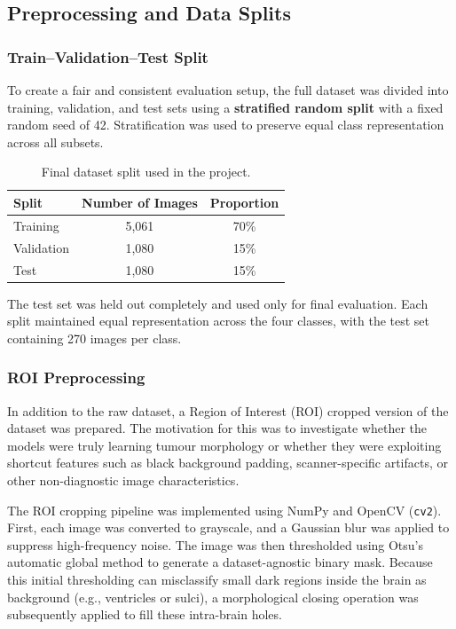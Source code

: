 \documentclass{article}
\begin{document}
\subsection{Preprocessing and Data Splits}

\subsubsection{Train--Validation--Test Split}

To create a fair and consistent evaluation setup, the full dataset was divided into training, validation, and test sets using a \textbf{stratified random split} with a fixed random seed of 42. Stratification was used to preserve equal class representation across all subsets.

\begin{table}[H]
\centering
\caption{Final dataset split used in the project.}
\label{tab:data_split}
\begin{tabular}{lcc}
\toprule
\textbf{Split} & \textbf{Number of Images} & \textbf{Proportion} \\
\midrule
Training   & 5,061 & 70\% \\
Validation & 1,080 & 15\% \\
Test       & 1,080 & 15\% \\
\bottomrule
\end{tabular}
\end{table}

The test set was held out completely and used only for final evaluation. Each split maintained equal representation across the four classes, with the test set containing 270 images per class.

\subsubsection{ROI Preprocessing}

In addition to the raw dataset, a Region of Interest (ROI) cropped version of the dataset was prepared. The motivation for this was to investigate whether the models were truly learning tumour morphology or whether they were exploiting shortcut features such as black background padding, scanner-specific artifacts, or other non-diagnostic image characteristics.

The ROI cropping pipeline was implemented using NumPy and OpenCV (\texttt{cv2}). First, each image was converted to grayscale, and a Gaussian blur was applied to suppress high-frequency noise. The image was then thresholded using Otsu's automatic global method to generate a dataset-agnostic binary mask. Because this initial thresholding can misclassify small dark regions inside the brain as background (e.g., ventricles or sulci), a morphological closing operation was subsequently applied to fill these intra-brain holes. 
\end{document}
